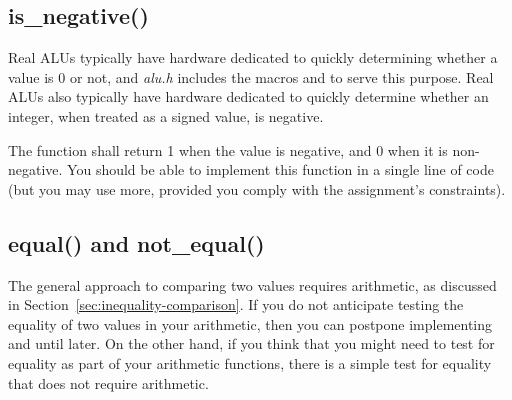 \vspace{1cm}

\begin{description}
\end{description}


\subsection{is\_negative()} \label{subsec:negative}

Real ALUs typically have hardware dedicated to quickly determining whether a value is 0 or not, and \textit{alu.h} includes the macros  and  to serve this purpose.
Real ALUs also typically have hardware dedicated to quickly determine whether an integer, when treated as a signed value, is negative.

\begin{description}
\end{description}
The function shall return 1 when the value is negative, and 0 when it is non-negative.
You should be able to implement this function in a single line of code (but you may use more, provided you comply with the assignment's constraints).


\subsection{equal() and not\_equal()}

The general approach to comparing two values requires arithmetic, as discussed in Section~\ref{sec:inequality-comparison}.
If you do not anticipate testing the equality of two values in your arithmetic, then you can postpone implementing  and  until later.
On the other hand, if you think that you might need to test for equality as part of your arithmetic functions, there is a simple test for equality that does not require arithmetic.

